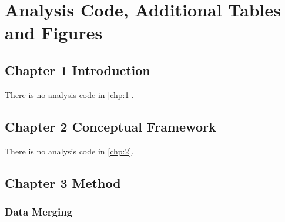 \chapter{Analysis Code, Additional Tables and Figures}

\begin{singlespace}

\section{Chapter 1 Introduction}

There is no analysis code in \cref{chp:1}.

\section{Chapter 2 Conceptual Framework}

There is no analysis code in \cref{chp:2}.

\section{Chapter 3 Method}

%

%

%

\subsection{Data Merging} \label{R.reimport}






\end{singlespace}
